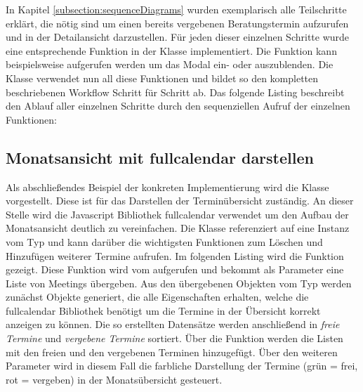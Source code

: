 In Kapitel \ref{subsection:sequenceDiagrams} wurden exemplarisch alle
Teilschritte erklärt, die nötig sind um einen bereits vergebenen
Beratungstermin aufzurufen und in der Detailansicht darzustellen. Für jeden
dieser einzelnen Schritte wurde eine entsprechende Funktion in der Klasse
 implementiert. Die Funktion
 kann beispielsweise aufgerufen werden um das
Modal ein- oder auszublenden. Die Klasse  verwendet
nun all diese Funktionen und bildet so den kompletten beschriebenen Workflow
Schritt für Schritt ab. Das folgende Listing beschreibt den Ablauf aller
einzelnen Schritte durch den sequenziellen Aufruf der einzelnen Funktionen:






\subsection{Monatsansicht mit fullcalendar darstellen}

Als abschließendes Beispiel der konkreten Implementierung wird die Klasse
 vorgestellt. Diese ist für das Darstellen der
Terminübersicht zuständig. An dieser Stelle wird die Javascript Bibliothek
\gls{fullcalendar} verwendet um den Aufbau der Monatsansicht deutlich zu vereinfachen. Die Klasse 
referenziert auf eine Instanz vom Typ  und kann darüber die
wichtigsten Funktionen zum Löschen und Hinzufügen weiterer Termine aufrufen. Im
folgenden Listing wird die Funktion  gezeigt.
Diese Funktion wird vom  aufgerufen und bekommt als
Parameter eine Liste von Meetings übergeben. Aus den übergebenen Objekten vom
Typ  werden zunächst Objekte generiert, die alle Eigenschaften
erhalten, welche die fullcalendar Bibliothek benötigt um die Termine
in der Übersicht korrekt anzeigen zu können. Die so erstellten Datensätze
werden anschließend in \textit{freie Termine} und \textit{vergebene Termine}
sortiert. Über die Funktion 
werden die Listen mit den freien und den vergebenen Terminen hinzugefügt. Über
den weiteren Parameter  wird in diesem Fall die farbliche
Darstellung der Termine (grün = frei, rot = vergeben) in der Monatsübersicht gesteuert.

